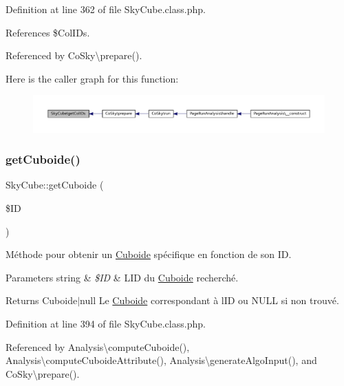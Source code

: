 Definition at line 362 of file Sky\+Cube.\+class.\+php.



References \$\+Col\+I\+Ds.



Referenced by Co\+Sky\textbackslash{}prepare().

Here is the caller graph for this function\+:\nopagebreak
\begin{figure}[H]
\begin{center}
\leavevmode
\includegraphics[width=350pt]{class_sky_cube_a4b5698250b2e467731f8d3c6a49e04a9_icgraph}
\end{center}
\end{figure}
\mbox{\label{class_sky_cube_a18c6b3ec100eb483e941b8bb69c40187}} 
\subsubsection{\texorpdfstring{get\+Cuboide()}{getCuboide()}}
{\footnotesize\ttfamily Sky\+Cube\+::get\+Cuboide (\begin{DoxyParamCaption}\item[{}]{\$\+ID }\end{DoxyParamCaption})}

Méthode pour obtenir un \hyperlink{class_cuboide}{Cuboide} spécifique en fonction de son ID.


\begin{DoxyParams}[1]{Parameters}
string & {\em \$\+ID} & L\textquotesingle{}ID du \hyperlink{class_cuboide}{Cuboide} recherché. \\
\hline
\end{DoxyParams}
\begin{DoxyReturn}{Returns}
Cuboide$\vert$null Le \hyperlink{class_cuboide}{Cuboide} correspondant à l\textquotesingle{}ID ou N\+U\+LL si non trouvé. 
\end{DoxyReturn}


Definition at line 394 of file Sky\+Cube.\+class.\+php.



Referenced by Analysis\textbackslash{}compute\+Cuboide(), Analysis\textbackslash{}compute\+Cuboide\+Attribute(), Analysis\textbackslash{}generate\+Algo\+Input(), and Co\+Sky\textbackslash{}prepare().

